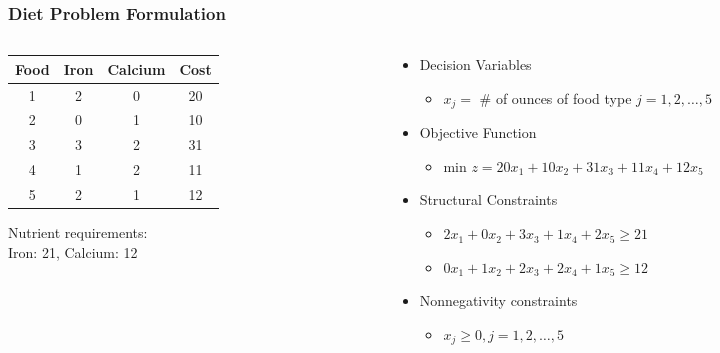 \documentclass[12pt,handout]{beamer}
\begin{document}
\begin{frame}
\frametitle{Diet Problem Formulation}
\begin{columns}[t]
\begin{column}{4cm}
\begin{center}
\begin{tabular} {c | c | c | c}
Food & Iron & Calcium & Cost \\
\hline
1 & 2 & 0 & 20 \\
2 & 0 & 1 & 10 \\
3 & 3 & 2 & 31 \\
4 & 1 & 2 & 11 \\
5 & 2 & 1 & 12 \\
\end{tabular}
\end{center}
Nutrient requirements: \\ Iron: 21, Calcium: 12
\end{column}
\begin{column}{7cm}
\begin{itemize}
\item Decision Variables
    \begin{itemize}
    \item $x_j = $ \# of ounces of food type $j = 1, 2, \ldots, 5$
    \end{itemize}
\item Objective Function
    \begin{itemize}
    \item min $z = 20 x_1 + 10 x_2 + 31 x_3 + 11 x_4 + 12 x_5$
    \end{itemize}
\item Structural Constraints
    \begin{itemize}
    \item $2 x_1 + 0 x_2 + 3 x_3 + 1 x_4 + 2 x_5 \ge 21$
    \item $0 x_1 + 1 x_2 + 2 x_3 + 2 x_4 + 1 x_5 \ge 12$
    \end{itemize}
\item Nonnegativity constraints
    \begin{itemize}
    \item $x_j \ge 0, j = 1, 2, \ldots, 5$
    \end{itemize}
\end{itemize}
\end{column}
\end{columns}
\end{frame}
\end{document}
